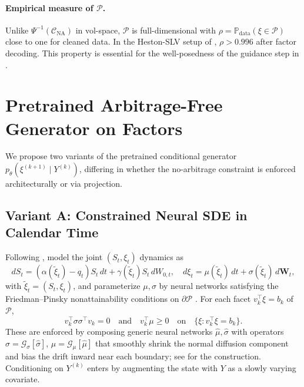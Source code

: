 \documentclass{article}
\newcommand{\Prob}{\mathbb{P}}
\newcommand{\1}{\mathbf{1}}
\newcommand{\cP}{\mathcal{P}}
\newcommand{\cC}{\mathcal{C}}
\newcommand{\cG}{\mathcal{G}}
\begin{document}
\paragraph{Empirical measure of $\cP$.} Unlike $\Psi^{-1}(\cC_{\mathrm{NA}})$ in vol-space, $\cP$ is full-dimensional with $\rho = \Prob_{\text{data}}(\xi \in \cP)$ close to one for cleaned data. In the Heston-SLV setup of \citet{cohen2021}, $\rho > 0.996$ after factor decoding. This property is essential for the well-posedness of the guidance step in .

\section{Pretrained Arbitrage-Free Generator on Factors}
\label{sec:pretrain}

We propose two variants of the pretrained conditional generator $p_\theta(\xi^{(k+1)} \mid Y^{(k)})$, differing in whether the no-arbitrage constraint is enforced architecturally or via projection.

\subsection{Variant A: Constrained Neural SDE in Calendar Time}
\label{sec:nsde}

Following \citet{cohen2021}, model the joint $(S_t, \xi_t)$ dynamics as
\begin{equation}
dS_t = (\alpha(\tilde\xi_t) - q_t) S_t \, dt + \gamma(\tilde\xi_t) S_t \, dW_{0,t}, \quad d\xi_t = \mu(\tilde\xi_t) \, dt + \sigma(\tilde\xi_t) \, d\mathbf{W}_t,
\label{eq:nsde}
\end{equation}
with $\tilde\xi_t = (S_t, \xi_t)$, and parameterize $\mu, \sigma$ by neural networks satisfying the Friedman--Pinsky nonattainability conditions on $\partial \cP$ \citep{friedman1973}. For each facet $v_k^\top \xi = b_k$ of $\cP$,
\begin{equation}
v_k^\top \sigma\sigma^\top v_k = 0 \quad\text{and}\quad v_k^\top \mu \ge 0 \quad\text{on}\quad \{\xi : v_k^\top \xi = b_k\}.
\label{eq:fp}
\end{equation}
These are enforced by composing generic neural networks $\hat\mu, \hat\sigma$ with operators $\sigma = \cG_\sigma[\hat\sigma]$, $\mu = \cG_\mu[\hat\mu]$ that smoothly shrink the normal diffusion component and bias the drift inward near each boundary; see \citet[\S 3]{cohen2021} for the construction. Conditioning on $Y^{(k)}$ enters by augmenting the state with $Y$ as a slowly varying covariate.
\end{document}
